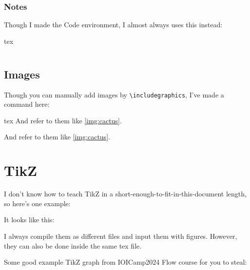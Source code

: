 \documentclass{fhw}
\begin{document}
\subsubsection{Notes}

Though I made the Code environment, I almost always uses this instead:
\begin{Code}{tex}
\begin{spacing}{1}
  \inputminted{py}{lab1/stackoverflow/solve.py}
\end{spacing}
\end{Code}

\subsection{Images}

Though you can manually add images by \verb|\includegraphics|, I've made a command here:
\begin{Code}{tex}
And refer to them like \cref{img:cactus}.
\end{Code}

And refer to them like \cref{img:cactus}.

\section{TikZ}

I don't know how to teach TikZ in a short-enough-to-fit-in-this-document length, so here's one example:


It looks like this:


I always compile them as different files and input them with figures. However, they can also be done inside the same tex file.

Some good example TikZ graph from IOICamp2024 Flow course for you to steal:
\end{document}
